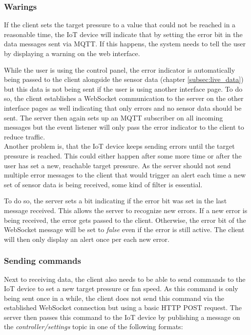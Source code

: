 \subsubsection{Warings}
\label{subsec:warnings}

If the client sets the target pressure to a value that could not be reached in a reasonable time, the IoT device will indicate that by setting the error bit in the data messages sent via MQTT. If this happens, the system needs to tell the user by displaying a warning on the web interface.

While the user is using the control panel, the error indicator is automatically being passed to the client alongside the sensor data (chapter \ref{subsec:live_data}) but this data is not being sent if the user is using another interface page. To do so, the client establishes a WebSocket communication to the server on the other interface pages as well indicating that only errors and no sensor data should be sent. The server then again sets up an MQTT subscriber on all incoming messages but the event listener will only pass the error indicator to the client to reduce traffic.\\

Another problem is, that the IoT device keeps sending errors until the target pressure is reached. This could either happen after some more time or after the user has set a new, reachable target pressure. As the server should not send multiple error messages to the client that would trigger an alert each time a new set of sensor data is being received, some kind of filter is essential.

To do so, the server sets a bit indicating if the error bit was set in the last message received. This allows the server to recognize new errors. If a new error is being received, the error gets passed to the client. Otherwise, the error bit of the WebSocket message will be set to \textit{false} even if the error is still active. The client will then only display an alert once per each new error.


\subsubsection{Sending commands}
\label{subsec:sending_commands}

Next to receiving data, the client also needs to be able to send commands to the IoT device to set a new target pressure or fan speed. As this command is only being sent once in a while, the client does not send this command via the established WebSocket connection but using a basic HTTP POST request. The server then passes this command to the IoT device by publishing a message on the \textit{controller/settings} topic in one of the following formats:

